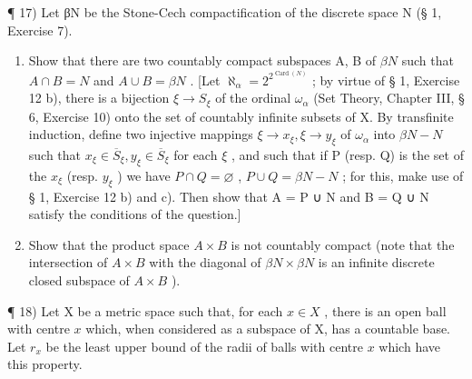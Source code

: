 ¶ 17) Let βN be the Stone-Cech compactification of the discrete space N (§ 1, Exercise 7).

\begin{enumerate}
\def\labelenumi{\alph{enumi})}
\item
  Show that there are two countably compact subspaces A, B of \(\beta N\) such that \(A \cap B = N\) and \(A \cup B = \beta N\) . {[}Let \(\aleph_{\alpha} = 2^{2^{\operatorname{Card}(N)}}\) ; by virtue of § 1, Exercise 12 b), there is a bijection \(\xi \to S_{\xi}\) of the ordinal \(\omega_{\alpha}\) (Set Theory, Chapter III, § 6, Exercise 10) onto the set of countably infinite subsets of X. By transfinite induction, define two injective mappings \(\xi \to x_{\xi}, \xi \to y_{\xi}\) of \(\omega_{\alpha}\) into \(\beta N - N\) such that \(x_{\xi} \in \overline{S}_{\xi}, y_{\xi} \in \overline{S}_{\xi}\) for each \(\xi\) , and such that if P (resp. Q) is the set of the \(x_{\xi}\) (resp. \(y_{\xi}\) ) we have \(P \cap Q = \varnothing\) , \(P \cup Q = \beta N - N\) ; for this, make use of § 1, Exercise 12 b) and c). Then show that A = P ∪ N and B = Q ∪ N satisfy the conditions of the question.{]}
\item
  Show that the product space \(A \times B\) is not countably compact (note that the intersection of \(A \times B\) with the diagonal of \(\beta N \times \beta N\) is an infinite discrete closed subspace of \(A \times B\) ).
\end{enumerate}

¶ 18) Let X be a metric space such that, for each \(x \in X\) , there is an open ball with centre \(x\) which, when considered as a subspace of X, has a countable base. Let \(r_x\) be the least upper bound of the radii of balls with centre \(x\) which have this property.

